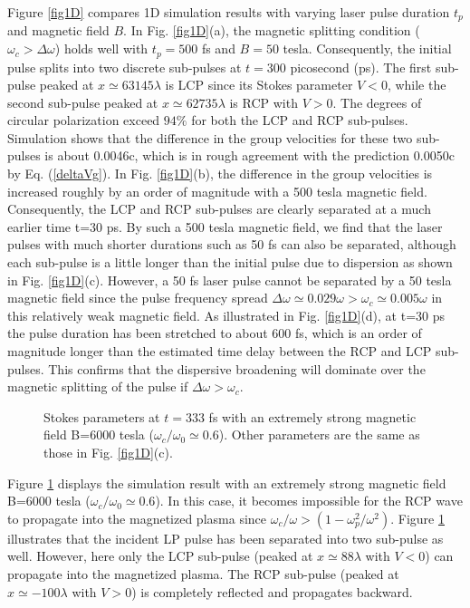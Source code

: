 \documentclass[%
aps,
preprint,
showpacs,
preprintnumbers,
 amsmath,
 amssymb,
 prl,
]{revtex4-1}
\begin{document}
Figure \ref{fig1D} compares 1D simulation results with varying laser pulse duration $t_p$ and magnetic field $B$.
In Fig. \ref{fig1D}(a), the magnetic splitting condition ($\omega_{c}>\Delta\omega$) holds well with $t_p=500$ fs and $B=50$ tesla.
Consequently, the initial pulse splits into two discrete sub-pulses at $t=300$ picosecond (ps).
The first sub-pulse peaked at $x\simeq63145\lambda$ is LCP since its Stokes parameter $V<0$, while the second sub-pulse peaked at $x\simeq62735\lambda$ is RCP with $V>0$.
The degrees of circular polarization exceed $94\%$ for both the LCP and RCP sub-pulses.
Simulation shows that the difference in the group velocities for these two sub-pulses is about 0.0046c, which is in rough agreement with the prediction 0.0050c by Eq. (\ref{deltaVg}).
In Fig. \ref{fig1D}(b), the difference in the group velocities is increased roughly by an order of magnitude with a 500 tesla magnetic field.
Consequently, the LCP and RCP sub-pulses are clearly separated at a much earlier time t=30 ps.
By such a 500 tesla magnetic field, we find that the laser pulses with much shorter durations such as 50 fs can also be separated, although each sub-pulse is a little longer than the initial pulse due to dispersion as shown in Fig. \ref{fig1D}(c).
However, a 50 fs laser pulse cannot be separated by a 50 tesla magnetic field since the pulse frequency spread $\Delta\omega \simeq 0.029\omega > \omega_c \simeq 0.005 \omega$ in this relatively weak magnetic field.
As illustrated in Fig. \ref{fig1D}(d), at t=30 ps the pulse duration has been stretched to about 600 fs, which is an order of magnitude longer than the estimated time delay between the RCP and LCP sub-pulses. This confirms that the dispersive broadening will dominate over the magnetic splitting of the pulse if $\Delta\omega>\omega_{c}$.

\begin{figure}[htbp]
\centering
{}
\caption{Stokes parameters at $t=333$ fs with an extremely strong magnetic field B=6000 tesla ($\omega_c/\omega_0\simeq0.6$). Other parameters are the same as those in Fig. \ref{fig1D}(c).
}
\label{figRCP}
\end{figure}

Figure \ref{figRCP} displays the simulation result with an extremely strong magnetic field B=6000 tesla ($\omega_c/\omega_0\simeq0.6$). In this case, it becomes impossible for the RCP wave to propagate into the magnetized plasma since $\omega_c/\omega > (1-\omega_p^2/\omega^2)$.
Figure \ref{figRCP} illustrates that the incident LP pulse has been separated into two sub-pulse as well.
However, here only the LCP sub-pulse (peaked at $x\simeq 88 \lambda$ with $V<0$) can propagate into the magnetized plasma. The RCP sub-pulse (peaked at $x\simeq -100 \lambda$ with $V>0$) is completely reflected and propagates backward.
\end{document}
